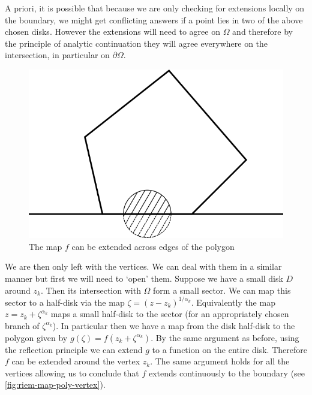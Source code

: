A priori, it is possible that because we are only checking for extensions locally on the boundary, we might get conflicting answers if a point lies in two of the above chosen disks. However the extensions will need to agree on $\Omega$ and therefore by the principle of analytic continuation they will agree everywhere on the intersection, in particular on $\partial \Omega$. 

\begin{figure}[ht]
    \centering
    \includegraphics[scale=0.8]{Images/riem_map_poly_open_edges.png}
    \caption{The map $f$ can be extended across edges of the polygon}
    \label{fig:riem-map-pol-open-edges}
\end{figure}

We are then only left with the vertices. We can deal with them in a similar manner but first we will need to `open' them. Suppose we have a small disk $D$ around $z_k$. Then its intersection with $\Omega$ form a small sector. We can map this sector to a half-disk via the map $\zeta = (z - z_k)^{1/\alpha_k}$. Equivalently the map $z = z_k + \zeta^{\alpha_k}$ maps a small half-disk to the sector (for an appropriately chosen branch of $\zeta^{\alpha_k}$). In particular then we have a map from the disk half-disk to the polygon given by $g(\zeta) = f(z_k + \zeta^{\alpha_k})$. By the same argument as before, using the reflection principle we can extend $g$ to a function on the entire disk. Therefore $f$ can be extended around the vertex $z_k$. The same argument holds for all the vertices allowing us to conclude that $f$ extends continuously to the boundary (see \autoref{fig:riem-map-poly-vertex}).

